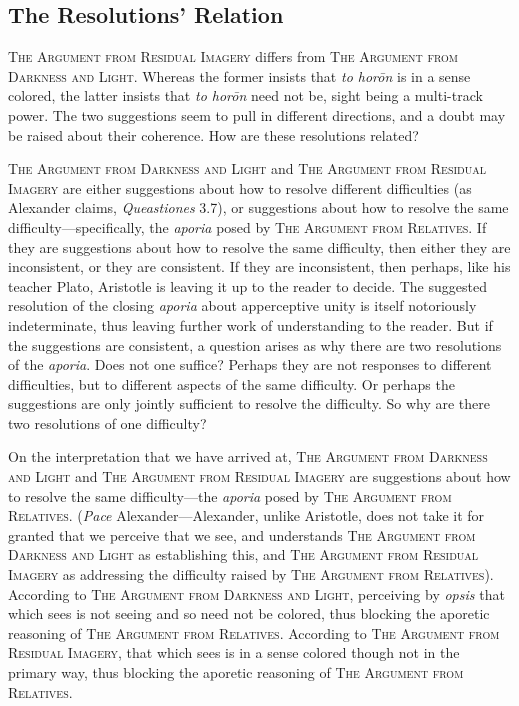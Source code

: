 

\subsection{The Resolutions' Relation} %
\label{sub:the_resolutions_relation}

\textsc{The Argument from Residual Imagery} differs from \textsc{The Argument from Darkness and Light}. Whereas the former insists that \emph{to horōn} is in a sense colored, the latter insists that \emph{to horōn} need not be, sight being a multi-track power. The two suggestions seem to pull in different directions, and a doubt may be raised about their coherence. How are these resolutions related?

\textsc{The Argument from Darkness and Light} and \textsc{The Argument from Residual Imagery} are either suggestions about how to resolve different difficulties (as Alexander claims, \emph{Queastiones} 3.7), or suggestions about how to resolve the same difficulty—specifically, the \emph{aporia} posed by \textsc{The Argument from Relatives}. If they are suggestions about how to resolve the same difficulty, then either they are inconsistent, or they are consistent. If they are inconsistent, then perhaps, like his teacher Plato, Aristotle is leaving it up to the reader to decide. The suggested resolution of the closing \emph{aporia} about apperceptive unity is itself notoriously indeterminate, thus leaving further work of understanding to the reader. But if the suggestions are consistent, a question arises as why there are two resolutions of the \emph{aporia}. Does not one suffice? Perhaps they are not responses to different difficulties, but to different aspects of the same difficulty. Or perhaps the suggestions are only jointly sufficient to resolve the difficulty. So why are there two resolutions of one difficulty?

On the interpretation that we have arrived at, \textsc{The Argument from Darkness and Light} and \textsc{The Argument from Residual Imagery} are suggestions about how to resolve the same difficulty—the \emph{aporia} posed by \textsc{The Argument from Relatives}. (\emph{Pace} Alexander—Alexander, unlike Aristotle, does not take it for granted that we perceive that we see, and understands \textsc{The Argument from Darkness and Light} as establishing this, and \textsc{The Argument from Residual Imagery} as addressing the difficulty raised by \textsc{The Argument from Relatives}). According to \textsc{The Argument from Darkness and Light}, perceiving by \emph{opsis} that which sees is not seeing and so need not be colored, thus blocking the aporetic reasoning of \textsc{The Argument from Relatives}. According to \textsc{The Argument from Residual Imagery}, that which sees is in a sense colored though not in the primary way, thus blocking the aporetic reasoning of \textsc{The Argument from Relatives}.

